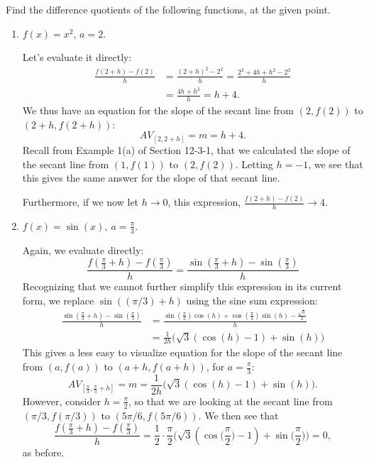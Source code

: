 \documentclass{ximera}
\begin{document}
\begin{example}
  Find the difference quotients of the following functions, at the given point. 
  \begin{enumerate}[label=\alph*.]
  \item $f(x)=x^2$, $a=2$.

    \begin{explanation}
      Let's evaluate it directly:
      \begin{align*}
        \frac{f(2+h)-f(2)}{h} &= \frac{(2+h)^2-2^2}{h} = \frac{2^2+4h+h^2-2^2}{h} \\ &= \frac{4h+h^2}{h} = h+4.
      \end{align*}
      We thus have an equation for the slope of the secant line from $(2,f(2))$ to $(2+h,f(2+h))$: 
      $$AV_{[2,2+h]}= m = h+4.$$
      Recall from Example 1(a) of Section 12-3-1, that we calculated the slope of the secant line from $(1,f(1))$ to $(2,f(2))$. Letting $h=-1$, we see that this gives the same answer for the slope of that secant line.
      
      Furthermore, if we now let $h \rightarrow 0$, this expression, $\frac{f(2+h)-f(2)}{h} \rightarrow 4$.
    \end{explanation}
    
  \item $f(x) = \sin (x), \ a =\frac{\pi}{3}$.\\
  \begin{explanation}
  Again, we evaluate directly:
  \begin{equation*}
   \frac{f(\frac{\pi}{3} + h) - f(\frac{\pi}{3})}{h} = \frac{\sin(\frac{\pi}{3} +h) - \sin (\frac{\pi}{3})}{h}
  \end{equation*}
  Recognizing that we cannot further simplify this expression in its current form, we replace $\sin((\pi/3) +h)$ using the sine sum expression:
  \begin{align*}
  \frac{\sin(\frac{\pi}{3} +h) - \sin (\frac{\pi}{3})}{h} 
  &= \frac{\sin(\frac{\pi}{3})\cos (h) + \cos(\frac{\pi}{3}) \sin( h) - \frac{\sqrt{3}}{2}}{h} \\
  &= \frac{1}{2h}\big(\sqrt{3}(\cos (h) -1) + \sin( h)\big)
  \end{align*}
  This gives a less easy to visualize equation for the slope of the secant line from $(a,f(a))$ to $(a+h,f(a+h))$, for $a=\frac{\pi}{3}$: 
  $$AV_{[\frac{\pi}{3},\frac{\pi}{3}+h]}= m =\frac{1}{2h}\big(\sqrt{3}(\cos (h) -1) + \sin( h)\big).$$ 
  However, consider $h=\frac{\pi}{2}$, so that we are looking at the secant line from $(\pi/3, f(\pi/3))$ to $(5\pi/6, f(5\pi/6))$. We then see that 
  $$ \frac{f(\frac{\pi}{3} + h) - f(\frac{\pi}{3})}{h} = \frac{1}{2} \cdot \frac{\pi}{2}\big(\sqrt{3}(\cos\Big(\frac{\pi}{2}\Big) -1)+ \sin\Big(\frac{\pi}{2}\Big) \big)= 0,$$
 as before.
 

\end{explanation}
\end{enumerate}
\end{example}
\end{document}
